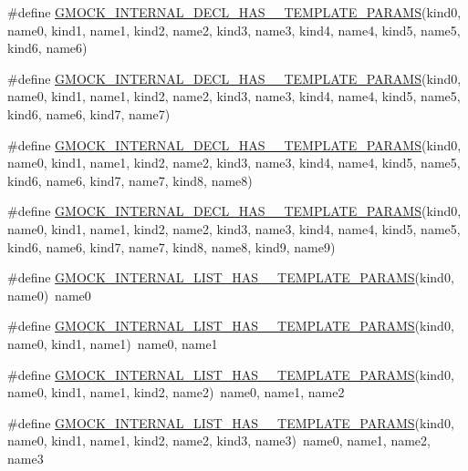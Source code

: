 \begin{DoxyCompactItemize}
\item 
\#define \hyperlink{gmock-generated-actions_8h_aaafa5e8b1a116aa8e7f88653415e60cd}{G\+M\+O\+C\+K\+\_\+\+I\+N\+T\+E\+R\+N\+A\+L\+\_\+\+D\+E\+C\+L\+\_\+\+H\+A\+S\+\_\+\_\+\+T\+E\+M\+P\+L\+A\+T\+E\+\_\+\+P\+A\+R\+A\+MS}(kind0,  name0,  kind1,  name1,  kind2,  name2,  kind3,  name3,  kind4,  name4,  kind5,  name5,  kind6,  name6)
\item 
\#define \hyperlink{gmock-generated-actions_8h_a8d8ec2523daa6fc6c5b8f6a45898e0b1}{G\+M\+O\+C\+K\+\_\+\+I\+N\+T\+E\+R\+N\+A\+L\+\_\+\+D\+E\+C\+L\+\_\+\+H\+A\+S\+\_\+\_\+\+T\+E\+M\+P\+L\+A\+T\+E\+\_\+\+P\+A\+R\+A\+MS}(kind0,  name0,  kind1,  name1,  kind2,  name2,  kind3,  name3,  kind4,  name4,  kind5,  name5,  kind6,  name6,  kind7,  name7)
\item 
\#define \hyperlink{gmock-generated-actions_8h_ae6dd478ff5757fa4e66ef2dcf6e22325}{G\+M\+O\+C\+K\+\_\+\+I\+N\+T\+E\+R\+N\+A\+L\+\_\+\+D\+E\+C\+L\+\_\+\+H\+A\+S\+\_\+\_\+\+T\+E\+M\+P\+L\+A\+T\+E\+\_\+\+P\+A\+R\+A\+MS}(kind0,  name0,  kind1,  name1,  kind2,  name2,  kind3,  name3,  kind4,  name4,  kind5,  name5,  kind6,  name6,  kind7,  name7,  kind8,  name8)
\item 
\#define \hyperlink{gmock-generated-actions_8h_aa3db5758c68ca3a45a795d91fea7bb42}{G\+M\+O\+C\+K\+\_\+\+I\+N\+T\+E\+R\+N\+A\+L\+\_\+\+D\+E\+C\+L\+\_\+\+H\+A\+S\+\_\+\_\+\+T\+E\+M\+P\+L\+A\+T\+E\+\_\+\+P\+A\+R\+A\+MS}(kind0,  name0,  kind1,  name1,  kind2,  name2,  kind3,  name3,  kind4,  name4,  kind5,  name5,  kind6,  name6,  kind7,  name7,  kind8,  name8,  kind9,  name9)
\item 
\#define \hyperlink{gmock-generated-actions_8h_a900f637cda387230021133903f5e078b}{G\+M\+O\+C\+K\+\_\+\+I\+N\+T\+E\+R\+N\+A\+L\+\_\+\+L\+I\+S\+T\+\_\+\+H\+A\+S\+\_\+\_\+\+T\+E\+M\+P\+L\+A\+T\+E\+\_\+\+P\+A\+R\+A\+MS}(kind0,  name0)~name0
\item 
\#define \hyperlink{gmock-generated-actions_8h_ab89cb2aad7a5ededf9397ffd58fb8a9a}{G\+M\+O\+C\+K\+\_\+\+I\+N\+T\+E\+R\+N\+A\+L\+\_\+\+L\+I\+S\+T\+\_\+\+H\+A\+S\+\_\+\_\+\+T\+E\+M\+P\+L\+A\+T\+E\+\_\+\+P\+A\+R\+A\+MS}(kind0,  name0,  kind1,  name1)~name0, name1
\item 
\#define \hyperlink{gmock-generated-actions_8h_a1f3bd0693e586000f0b8a5324183b47f}{G\+M\+O\+C\+K\+\_\+\+I\+N\+T\+E\+R\+N\+A\+L\+\_\+\+L\+I\+S\+T\+\_\+\+H\+A\+S\+\_\+\_\+\+T\+E\+M\+P\+L\+A\+T\+E\+\_\+\+P\+A\+R\+A\+MS}(kind0,  name0,  kind1,  name1,  kind2,  name2)~name0, name1, name2
\item 
\#define \hyperlink{gmock-generated-actions_8h_a6b509ec43356784c0bb70056dcd2c5a2}{G\+M\+O\+C\+K\+\_\+\+I\+N\+T\+E\+R\+N\+A\+L\+\_\+\+L\+I\+S\+T\+\_\+\+H\+A\+S\+\_\+\_\+\+T\+E\+M\+P\+L\+A\+T\+E\+\_\+\+P\+A\+R\+A\+MS}(kind0,  name0,  kind1,  name1,  kind2,  name2,  kind3,  name3)~name0, name1, name2, name3

\end{DoxyCompactItemize}

